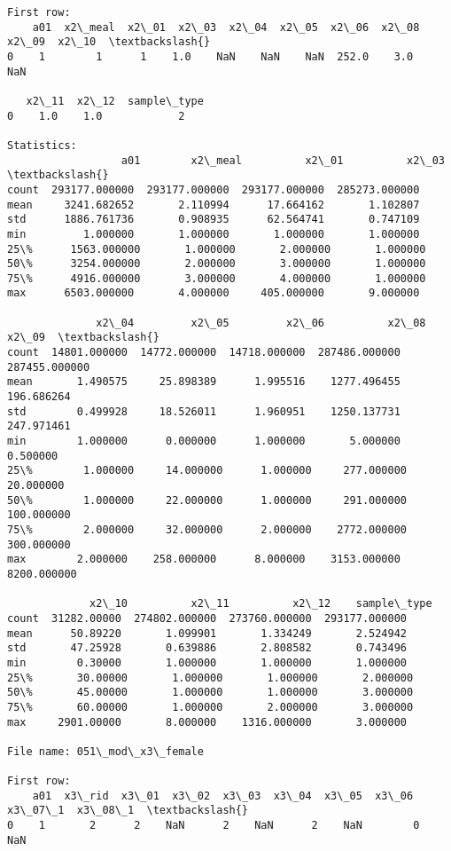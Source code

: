 \documentclass[11pt]{article}
\begin{document}
\begin{Verbatim}[commandchars=\\\{\}]
First row: 
    a01  x2\_meal  x2\_01  x2\_03  x2\_04  x2\_05  x2\_06  x2\_08  x2\_09  x2\_10  \textbackslash{}
0    1        1      1    1.0    NaN    NaN    NaN  252.0    3.0    NaN   

   x2\_11  x2\_12  sample\_type  
0    1.0    1.0            2  

Statistics: 
                  a01        x2\_meal          x2\_01          x2\_03  \textbackslash{}
count  293177.000000  293177.000000  293177.000000  285273.000000   
mean     3241.682652       2.110994      17.664162       1.102807   
std      1886.761736       0.908935      62.564741       0.747109   
min         1.000000       1.000000       1.000000       1.000000   
25\%      1563.000000       1.000000       2.000000       1.000000   
50\%      3254.000000       2.000000       3.000000       1.000000   
75\%      4916.000000       3.000000       4.000000       1.000000   
max      6503.000000       4.000000     405.000000       9.000000   

              x2\_04         x2\_05         x2\_06          x2\_08          x2\_09  \textbackslash{}
count  14801.000000  14772.000000  14718.000000  287486.000000  287455.000000   
mean       1.490575     25.898389      1.995516    1277.496455     196.686264   
std        0.499928     18.526011      1.960951    1250.137731     247.971461   
min        1.000000      0.000000      1.000000       5.000000       0.500000   
25\%        1.000000     14.000000      1.000000     277.000000      20.000000   
50\%        1.000000     22.000000      1.000000     291.000000     100.000000   
75\%        2.000000     32.000000      2.000000    2772.000000     300.000000   
max        2.000000    258.000000      8.000000    3153.000000    8200.000000   

             x2\_10          x2\_11          x2\_12    sample\_type  
count  31282.00000  274802.000000  273760.000000  293177.000000  
mean      50.89220       1.099901       1.334249       2.524942  
std       47.25928       0.639886       2.808582       0.743496  
min        0.30000       1.000000       1.000000       1.000000  
25\%       30.00000       1.000000       1.000000       2.000000  
50\%       45.00000       1.000000       1.000000       3.000000  
75\%       60.00000       1.000000       2.000000       3.000000  
max     2901.00000       8.000000    1316.000000       3.000000  

File name: 051\_mod\_x3\_female

First row: 
    a01  x3\_rid  x3\_01  x3\_02  x3\_03  x3\_04  x3\_05  x3\_06  x3\_07\_1  x3\_08\_1  \textbackslash{}
0    1       2      2    NaN      2    NaN      2    NaN        0      NaN   


\end{Verbatim}
\end{document}
